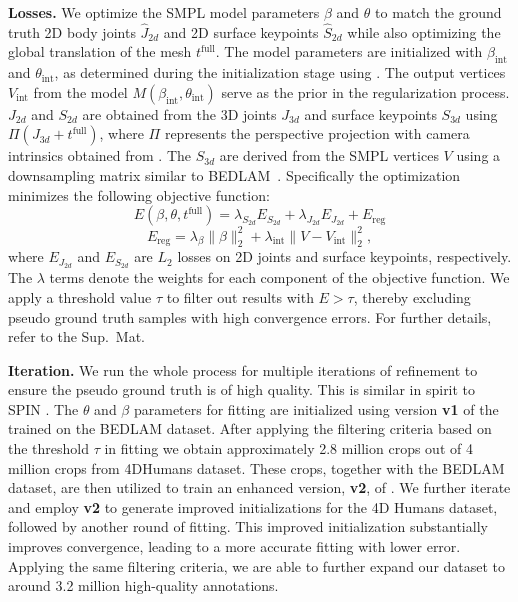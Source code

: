 \noindent\textbf{Losses.}
We optimize the SMPL model parameters $\beta$ and $\theta$ to match the ground truth 2D body joints $\hat{J}_{2d}$ and 2D surface keypoints $\hat{S}_{2d}$ while also optimizing the global translation of the mesh $t^{\text{full}}$. The model parameters are initialized with $\beta_{\text{int}}$ and $\theta_{\text{int}}$, as determined during the initialization stage using \hpsmodel. The output vertices $V_{\text{int}}$ from the model $M(\beta_{\text{int}}, \theta_{\text{int}})$ serve as the prior in the regularization process. $J_{2d}$ and $S_{2d}$ are  obtained from the 3D joints $J_{3d}$ and surface keypoints $S_{3d}$ using $\Pi(J_{3d} + t^{\text{full}})$, where $\Pi$ represents the perspective projection with camera intrinsics obtained from \cameramodel. The $S_{3d}$ are derived from the SMPL vertices $V$ using a downsampling matrix similar to BEDLAM~\cite{bedlam}.
Specifically the optimization minimizes the following objective function:
\begin{equation}
E(\beta, \theta, t^{\text{full}}) = \lambda_{S_{2d}} E_{S_{2d}} + \lambda_{J_{2d}} E_{J_{2d}} + E_\text{reg}
\end{equation}
\begin{equation}
E_\text{reg} = \lambda_{\beta} \|\beta\|_2^2 + \lambda_{\text{int}} \| V - V_{\text{int}} \|_2^2,
    \label{main:eq:reg}
\end{equation}
where $E_{J_{2d}}$ and $E_{S_{2d}}$ are $L_2$ losses on 2D joints and surface keypoints, respectively. The $\lambda$ terms denote the weights for each component of the objective function.
We apply a threshold value $\tau$ to filter out results with $E > \tau$, thereby excluding pseudo ground truth samples with high convergence errors. For further details, refer to the Sup.~Mat.

\noindent\textbf{Iteration.}
We run the whole process for multiple iterations of refinement to ensure the pseudo ground truth is of high quality. This is similar in spirit to SPIN \cite{spin}.
The $\theta$ and $\beta$ parameters for \camsmplify fitting are initialized using version \textbf{v1} of the \hpsmodel trained on the BEDLAM dataset. After applying the filtering criteria based on the threshold $\tau$ in \camsmplify fitting we obtain approximately 2.8 million crops out of 4 million crops from 4DHumans dataset. These crops, together with the BEDLAM dataset, are then utilized to train an enhanced version, \textbf{v2}, of \hpsmodel. 
We further iterate and employ \textbf{v2} to generate improved initializations for the 4D Humans dataset, followed by another round of \camsmplify fitting.  This improved initialization substantially improves convergence, leading to a more accurate fitting with lower error. Applying the same filtering criteria, we are able to further expand our dataset to around 3.2 million high-quality annotations.







 